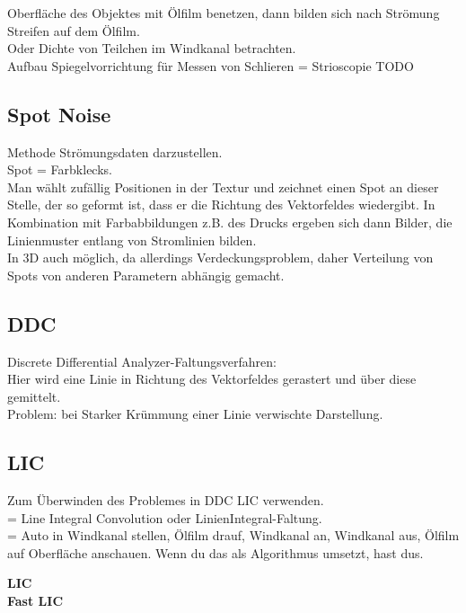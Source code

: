 \documentclass{article}
\begin{document}
\noindent Oberfläche des Objektes mit Ölfilm benetzen, dann bilden sich nach Strömung Streifen auf dem Ölfilm.\\
Oder Dichte von Teilchen im Windkanal betrachten.\\

\noindent Aufbau Spiegelvorrichtung für Messen von Schlieren = Strioscopie TODO

\subsection{Spot Noise}
Methode Strömungsdaten darzustellen.\\
Spot = Farbklecks.\\
Man wählt zufällig Positionen in der Textur und zeichnet einen Spot an dieser Stelle, der so geformt ist, dass er die Richtung des Vektorfeldes wiedergibt. In Kombination mit Farbabbildungen z.B. des Drucks ergeben sich dann Bilder, die Linienmuster entlang von Stromlinien bilden.\\

\noindent In 3D auch möglich, da allerdings Verdeckungsproblem, daher Verteilung von Spots von anderen Parametern abhängig gemacht.\\

\subsection{DDC}

\noindent Discrete Differential Analyzer-Faltungsverfahren:\\
Hier wird eine Linie in Richtung des Vektorfeldes gerastert und über diese gemittelt.\\
Problem: bei Starker Krümmung einer Linie verwischte Darstellung. \\


\subsection{LIC}
Zum Überwinden des Problemes in DDC LIC verwenden.\\
= Line Integral Convolution oder LinienIntegral-Faltung.\\
= Auto in Windkanal stellen, Ölfilm drauf, Windkanal an, Windkanal aus, Ölfilm auf Oberfläche anschauen. Wenn du das als Algorithmus umsetzt, hast dus. 

\noindent \textbf{LIC}\\

\noindent \textbf{Fast LIC}\\
\end{document}
